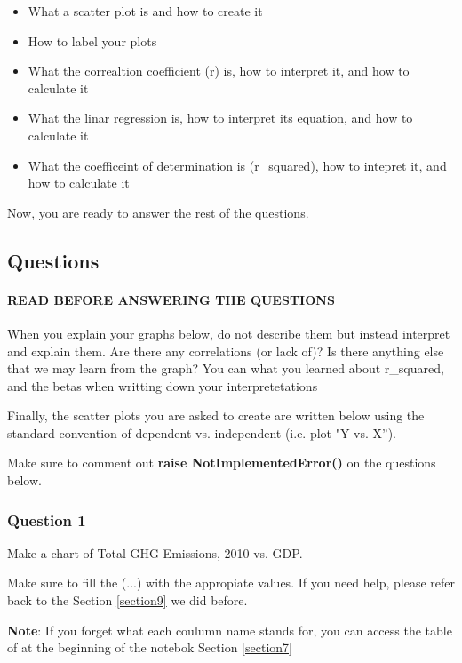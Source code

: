\documentclass[11pt]{article}
\providecommand{\tightlist}{%
      \setlength{\itemsep}{0pt}\setlength{\parskip}{0pt}}
\begin{document}
\begin{itemize}
\tightlist
\item
  What a scatter plot is and how to create it
\item
  How to label your plots
\item
  What the correaltion coefficient (r) is, how to interpret it, and how
  to calculate it
\item
  What the linar regression is, how to interpret its equation, and how
  to calculate it
\item
  What the coefficeint of determination is (r\_squared), how to intepret
  it, and how to calculate it
\end{itemize}

Now, you are ready to answer the rest of the questions.

    \subsection{Questions }\label{questions}

\paragraph{READ BEFORE ANSWERING THE
QUESTIONS}\label{read-before-answering-the-questions}

When you explain your graphs below, do not describe them but instead
interpret and explain them. Are there any correlations (or lack of)? Is
there anything else that we may learn from the graph? You can what you
learned about r\_squared, and the betas when writting down your
interpretetations

Finally, the scatter plots you are asked to create are written below
using the standard convention of dependent vs. independent (i.e. plot "Y
vs. X'').

Make sure to comment out \textbf{raise NotImplementedError()} on the
questions below.

    \subsubsection{Question 1}\label{question-1}

Make a chart of Total GHG Emissions, 2010 vs. GDP.

Make sure to fill the (...) with the appropiate values. If you need
help, please refer back to the Section \ref{section9} we did before.

\textbf{Note}: If you forget what each coulumn name stands for, you can
access the table of at the beginning of the notebok
Section \ref{section7}
\end{document}

